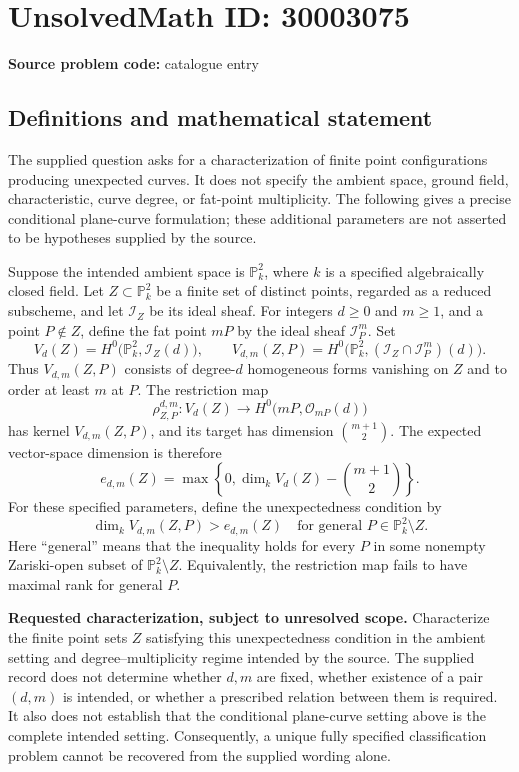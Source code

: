 \documentclass[11pt]{article}
\newcommand{\PP}{\mathbb{P}}
\begin{document}
\section*{UnsolvedMath ID: 30003075}
\textbf{Source problem code:} catalogue entry
\subsection{Definitions and mathematical statement}
The supplied question asks for a characterization of finite point configurations producing unexpected curves. It does not specify the ambient space, ground field, characteristic, curve degree, or fat-point multiplicity. The following gives a precise conditional plane-curve formulation; these additional parameters are not asserted to be hypotheses supplied by the source.

Suppose the intended ambient space is \(\PP^2_k\), where \(k\) is a specified algebraically closed field. Let \(Z\subset\PP^2_k\) be a finite set of distinct points, regarded as a reduced subscheme, and let \(\mathcal I_Z\) be its ideal sheaf. For integers \(d\geq 0\) and \(m\geq 1\), and a point \(P\notin Z\), define the fat point \(mP\) by the ideal sheaf \(\mathcal I_P^m\). Set
\[
V_d(Z)=H^0\bigl(\PP^2_k,\mathcal I_Z(d)\bigr),\qquad
V_{d,m}(Z,P)=H^0\bigl(\PP^2_k,(\mathcal I_Z\cap\mathcal I_P^m)(d)\bigr).
\]
Thus \(V_{d,m}(Z,P)\) consists of degree-\(d\) homogeneous forms vanishing on \(Z\) and to order at least \(m\) at \(P\). The restriction map
\[
\rho_{Z,P}^{d,m}:V_d(Z)\longrightarrow H^0\bigl(mP,\mathcal O_{mP}(d)\bigr)
\]
has kernel \(V_{d,m}(Z,P)\), and its target has dimension \(\binom{m+1}{2}\). The expected vector-space dimension is therefore
\[
e_{d,m}(Z)=\max\left\{0,\dim_k V_d(Z)-\binom{m+1}{2}\right\}.
\]
For these specified parameters, define the unexpectedness condition by
\[
\dim_k V_{d,m}(Z,P)>e_{d,m}(Z)
\quad\text{for general }P\in\PP^2_k\setminus Z.
\]
Here ``general'' means that the inequality holds for every \(P\) in some nonempty Zariski-open subset of \(\PP^2_k\setminus Z\). Equivalently, the restriction map fails to have maximal rank for general \(P\).

\textbf{Requested characterization, subject to unresolved scope.} Characterize the finite point sets \(Z\) satisfying this unexpectedness condition in the ambient setting and degree--multiplicity regime intended by the source. The supplied record does not determine whether \(d,m\) are fixed, whether existence of a pair \((d,m)\) is intended, or whether a prescribed relation between them is required. It also does not establish that the conditional plane-curve setting above is the complete intended setting. Consequently, a unique fully specified classification problem cannot be recovered from the supplied wording alone.
\end{document}
